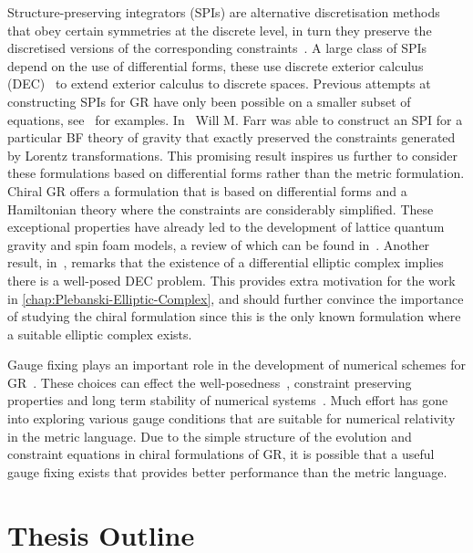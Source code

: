 \documentclass[10pt]{report}
\theoremstyle{definition}
\begin{document}
Structure-preserving integrators (SPIs) are alternative discretisation methods that obey certain symmetries at the discrete level, in turn they preserve the discretised versions of the corresponding constraints~\cite{HairerLubichWannerGeoNumIntStrPreAlg2010}. A large class of SPIs depend on the use of differential forms, these use discrete exterior calculus (DEC)~\cite{DiscreteExteriDesbru2005} to extend exterior calculus to discrete spaces. Previous attempts at constructing SPIs for GR have only been possible on a smaller subset of equations, see~\cite{Free_and_constr_Richte_2008,Constructing_of_Tsuchi_2016} for examples. In~\cite{NumericalRelatFarr2010} Will M. Farr was able to construct an SPI for a particular BF theory of gravity that exactly preserved the constraints generated by Lorentz transformations. This promising result inspires us further to consider these formulations based on differential forms rather than the metric formulation. Chiral GR offers a formulation that is based on differential forms and a Hamiltonian theory where the constraints are considerably simplified. These exceptional properties have already led to the development of lattice quantum gravity and spin foam models, a review of which can be found in~\cite{A_Short_Review_Ashtek_2021}. Another result,  in~\cite{Finite_element_Arnold_2009}, remarks that the existence of a differential elliptic complex implies there is a well-posed DEC problem. This provides extra motivation for the work in \cref{chap:Plebanski-Elliptic-Complex}, and should further convince the importance of studying the chiral formulation since this is the only known formulation where a suitable elliptic complex exists.

Gauge fixing plays an important role in the development of numerical schemes for GR~\cite{Gauge_condition_Alcubi_2003}. These choices can effect the well-posedness~\cite{Hyperb1+3YvonneTommaso1983}, constraint preserving properties and long term stability of numerical systems~\cite{Hyperbolic_Meth_Reula_1998}. Much effort has gone into exploring various gauge conditions that are suitable for numerical relativity in the metric language. Due to the simple structure of the evolution and constraint equations in chiral formulations of GR, it is possible that a useful gauge fixing exists that provides better performance than the metric language.

\section*{Thesis Outline}
\end{document}

